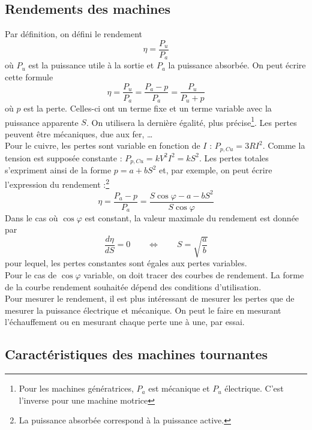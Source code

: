 	\subsection{Rendements des machines}
	Par définition, on défini le rendement 
	\begin{equation}
	\eta = \frac{P_u}{P_a}
	\end{equation}
	où $P_u$ est la puissance utile à la sortie et $P_a$ la puissance 
	absorbée. On peut écrire cette formule
	\begin{equation}
	\eta = \frac{P_u}{P_a} = \frac{P_a-p}{P_a} = \frac{P_u}{P_u+p}
	\end{equation}
	où $p$ est la perte. Celles-ci ont un terme fixe et un terme variable avec 
	la puissance apparente $S$. On utilisera la dernière égalité, plus précise\footnote{
	Pour les machines génératrices, $P_a$ est mécanique et $P_u$ électrique. C'est 
	l'inverse pour une machine motrice}. Les pertes peuvent être mécaniques, 
	due aux fer, \dots\\
	
	Pour le cuivre, les pertes sont variable en fonction de $I$ : $P_{p,Cu} = 3
	RI^2$. Comme la tension est supposée constante : $P_{p,Cu} = kV^2I^2 = kS^2$. 
	Les pertes totales s'expriment ainsi de la forme $p = a+bS^2$ et, par exemple, 
	on peut écrire l'expression du rendement :\footnote{La puissance absorbée correspond à la puissance active.}
	\begin{equation}
	\eta = \frac{P_a-p}{P_a} = \dfrac{S\cos\varphi-a-bS^2}{S\cos\varphi}
	\end{equation}
	Dans le cas où $\cos \varphi$ est constant, la valeur maximale du rendement est donnée par
	\begin{equation}
	\frac{d\eta}{dS} = 0\qquad \Leftrightarrow\qquad S = \sqrt{\frac{a}{b}}
	\end{equation}
	pour lequel, les pertes constantes sont égales aux pertes variables. \\
	Pour le cas de $\cos \varphi$ variable, on doit tracer des courbes de rendement. 
	La forme de la courbe rendement souhaitée dépend des conditions d'utilisation.\\
	Pour mesurer le rendement, il est plus intéressant de mesurer les pertes que 
	de mesurer la puissance électrique et mécanique. On peut le faire en mesurant 
	l'échauffement ou en mesurant chaque perte une à une, par essai.
	
	
	\subsection{Caractéristiques des machines tournantes}
